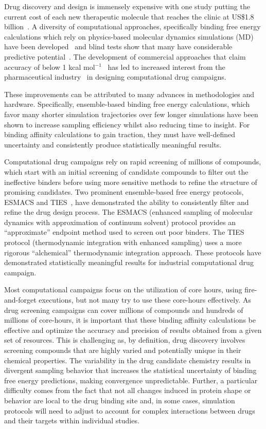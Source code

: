 Drug discovery and design is immensely expensive with one study putting the
current cost of each new therapeutic molecule that reaches the clinic at
US\$1.8 billion~\cite{Paul2010}. A diversity of computational approaches,
specifically binding free energy calculations which rely on physics-based
molecular dynamics simulations (MD) have been developed~\cite{Mobley2012} and
blind tests show that many have considerable predictive
potential~\cite{Mey2017,Yin2017}. The development of commercial approaches
that claim accuracy of below 1 kcal mol$^{-1}$~\cite{Wang2015} has led to
increased interest from the pharmaceutical industry~\cite{Ganesan2017} in
designing computational drug campaigns.

These improvements can be attributed to many advances in methodologies and
hardware. Specifically, ensemble-based binding free energy calculations,
which favor many shorter simulation trajectories over few longer simulations
have been shown to increase sampling efficiency whilst also reducing time to
insight. For binding affinity calculations to gain
traction, they must have well-defined uncertainty and consistently produce
statistically meaningful results.

Computational drug campaigns rely on rapid screening of millions of
compounds, which start with an initial screening of candidate compounds to
filter out the ineffective binders before using more sensitive methods to
refine the structure of promising candidates. Two  prominent ensemble-based
free energy protocols, ESMACS and TIES~\cite{Bhati2017}, have demonstrated
the  ability to consistently filter and refine the drug design process. The
ESMACS  (enhanced sampling of molecular dynamics with approximation of
continuum solvent) protocol provides an ``approximate'' endpoint method used
to screen out poor binders. The TIES protocol (thermodynamic integration with
enhanced sampling) uses a more rigorous ``alchemical'' thermodynamic
integration approach. These protocols have demonstrated statistically
meaningful results for industrial computational drug
campaign\cite{Wan2017brd4}.

Most computational campaigns focus on the utilization of core hours, using
fire-and-forget executions, but not many try to use these core-hours
effectively. As drug screening campaigns can cover millions of compounds and
hundreds of millions of core-hours, it is important that these binding
affinity calculations be effective and optimize the accuracy and precision of
results obtained from a given set of resources. This is challenging as, by
definition, drug discovery involves screening compounds that are highly
varied and potentially unique in their chemical properties. The variability
in the drug candidate chemistry results in divergent sampling behavior that
increases the statistical uncertainty of binding free energy predictions,
making convergence unpredictable. Further, a particular difficulty comes from
the fact that not all changes induced in protein shape or behavior are local
to the drug binding site and, in some cases, simulation protocols will need
to adjust to account for complex interactions between drugs and their targets
within individual studies.

